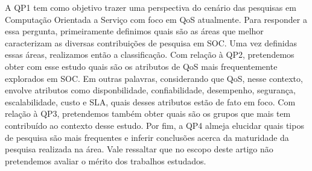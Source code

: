 A QP1 tem como objetivo trazer uma perspectiva do cen\'{a}rio das pesquisas em Computa\c{c}\~{a}o Orientada a Servi\c{c}o com foco em QoS atualmente. Para responder a essa pergunta, primeiramente definimos quais s\~{a}o as \'{a}reas que melhor caracterizam as diversas contribui\c{c}\~{o}es de pesquisa em SOC. Uma vez definidas essas \'{a}reas, realizamos ent\~{a}o a classifica\c{c}\~{a}o. Com rela\c{c}\~{a}o \`{a} QP2, pretendemos obter com esse estudo quais s\~{a}o os atributos de QoS mais frequentemente explorados em SOC. Em outras palavras, considerando que QoS, nesse contexto, envolve atributos como disponbilidade, confiabilidade, desempenho, seguran\c{c}a, escalabilidade, custo e SLA, quais desses atributos est\~{a}o de fato em foco. Com rela\c{c}\~{a}o \`{a} QP3, pretendemos tamb\'{e}m obter quais s\~{a}o os grupos que mais tem contribu\'{i}do ao contexto desse estudo. Por fim, a QP4 almeja elucidar quais tipos de pesquisa s\~{a}o mais frequentes e inferir conclusões acerca da maturidade da pesquisa realizada na \'{a}rea. Vale ressaltar que no escopo deste artigo n\~{a}o pretendemos avaliar o m\'{e}rito dos trabalhos estudados.


